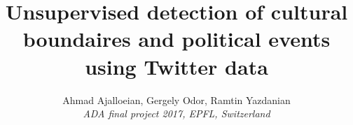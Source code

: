 \documentclass[8pt,conference,compsocconf]{IEEEtran}
\begin{document}
\title{Unsupervised detection of cultural boundaires and political events using Twitter data}

\author{
  Ahmad Ajalloeian, Gergely Odor, Ramtin Yazdanian\\
  \textit{ADA final project 2017, EPFL, Switzerland}
}
\maketitle

      


%




\end{document}
